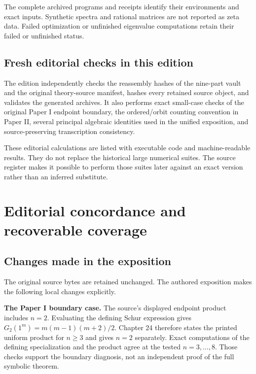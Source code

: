 \documentclass[
  10pt,
  a4paper,
  10pt,
  oneside,
  openany]{book}
\begin{document}
The complete archived programs and receipts identify their environments
and exact inputs. Synthetic spectra and rational matrices are not
reported as zeta data. Failed optimization or unfinished eigenvalue
computations retain their failed or unfinished status.

\subsection{Fresh editorial checks in this
edition}\label{fresh-editorial-checks-in-this-edition}

The edition independently checks the reassembly hashes of the nine-part
vault and the original theory-source manifest, hashes every retained
source object, and validates the generated archives. It also performs
exact small-case checks of the original Paper I endpoint boundary, the
ordered/orbit counting convention in Paper II, several principal
algebraic identities used in the unified exposition, and
source-preserving transcription consistency.

These editorial calculations are listed with executable code and
machine-readable results. They do not replace the historical large
numerical suites. The source register makes it possible to perform those
suites later against an exact version rather than an inferred
substitute.

\section{Editorial concordance and recoverable
coverage}\label{app-editorial}

\subsection{Changes made in the
exposition}\label{changes-made-in-the-exposition}

The original source bytes are retained unchanged. The authored
exposition makes the following local changes explicitly.

\textbf{The Paper I boundary case.} The source's displayed endpoint
product includes \(n=2\). Evaluating the defining Schur expression gives
\(G_2(1^m)=m(m-1)(m+2)/2\). Chapter 24 therefore states the printed
uniform product for \(n\ge3\) and gives \(n=2\) separately. Exact
computations of the defining specialization and the product agree at the
tested \(n=3,\ldots,8\). Those checks support the boundary diagnosis,
not an independent proof of the full symbolic theorem.
\end{document}
